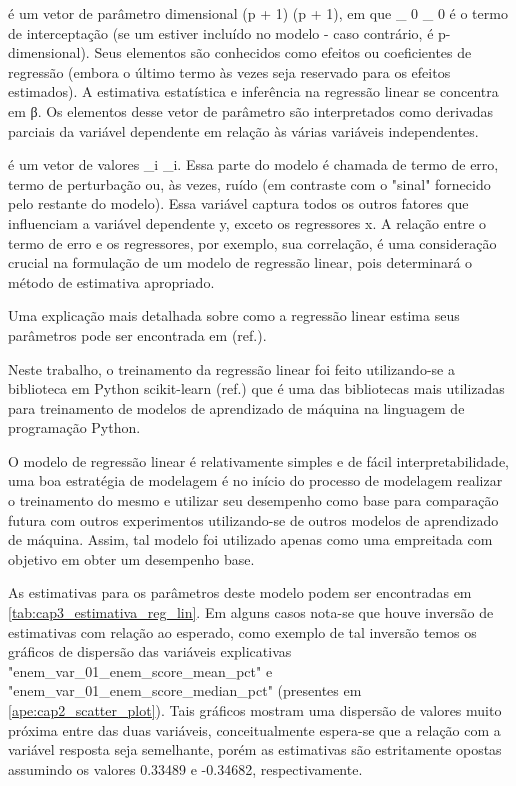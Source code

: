 {\displaystyle {\boldsymbol {\beta}}} {\boldsymbol {\beta}} é um vetor de parâmetro dimensional {\displaystyle (p + 1)} (p + 1), em que {\displaystyle \beta _ {0 }} \beta _ {0} é o termo de interceptação (se um estiver incluído no modelo - caso contrário, {\displaystyle {\boldsymbol {\beta}}} {\boldsymbol {\beta}} é p-dimensional). Seus elementos são conhecidos como efeitos ou coeficientes de regressão (embora o último termo às vezes seja reservado para os efeitos estimados). A estimativa estatística e inferência na regressão linear se concentra em β. Os elementos desse vetor de parâmetro são interpretados como derivadas parciais da variável dependente em relação às várias variáveis ​​independentes.

{\displaystyle {\boldsymbol {\varepsilon}}} {\displaystyle {\boldsymbol {\varepsilon}}} é um vetor de valores {\displaystyle \varepsilon_{i}} \varepsilon_{i}. Essa parte do modelo é chamada de termo de erro, termo de perturbação ou, às vezes, ruído (em contraste com o "sinal" fornecido pelo restante do modelo). Essa variável captura todos os outros fatores que influenciam a variável dependente y, exceto os regressores x. A relação entre o termo de erro e os regressores, por exemplo, sua correlação, é uma consideração crucial na formulação de um modelo de regressão linear, pois determinará o método de estimativa apropriado.

Uma explicação mais detalhada sobre como a regressão linear estima seus parâmetros pode ser encontrada em (ref.).

Neste trabalho, o treinamento da regressão linear foi feito utilizando-se a biblioteca em Python scikit-learn (ref.) que é uma das bibliotecas mais utilizadas para treinamento de modelos de aprendizado de máquina na linguagem de programação Python.

O modelo de regressão linear é relativamente simples e de fácil interpretabilidade, uma boa estratégia de modelagem é no início do processo de modelagem realizar o treinamento do mesmo e utilizar seu desempenho como base para comparação futura com outros experimentos utilizando-se de outros modelos de aprendizado de máquina. Assim, tal modelo foi utilizado apenas como uma empreitada com objetivo em obter um desempenho base.

As estimativas para os parâmetros deste modelo podem ser encontradas em \ref{tab:cap3_estimativa_reg_lin}. Em alguns casos nota-se que houve inversão de estimativas com relação ao esperado, como exemplo de tal inversão temos os gráficos de dispersão das variáveis explicativas "enem_var_01_enem_score_mean_pct" e "enem_var_01_enem_score_median_pct" (presentes em \ref{ape:cap2_scatter_plot}). Tais gráficos mostram uma dispersão de valores muito próxima entre das duas variáveis, conceitualmente espera-se que a relação com a variável resposta seja semelhante, porém as estimativas são estritamente opostas assumindo os valores 0.33489 e -0.34682, respectivamente.

